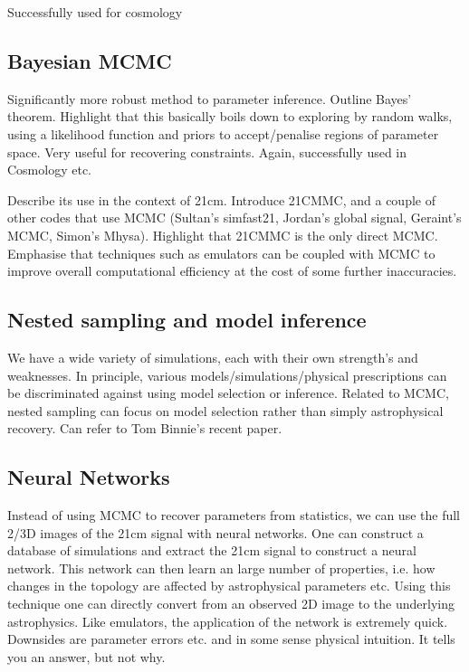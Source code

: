 Successfully used for cosmology

\subsection{Bayesian MCMC}

Significantly more robust method to parameter inference. Outline Bayes' theorem. Highlight that this basically boils down to exploring by random walks, using a likelihood function and priors to accept/penalise regions of parameter space. Very useful for recovering constraints. Again, successfully used in Cosmology etc.

Describe its use in the context of 21cm. Introduce 21CMMC, and a couple of other codes that use MCMC (Sultan's simfast21, Jordan's global signal, Geraint's MCMC, Simon's Mhysa). Highlight that 21CMMC is the only direct MCMC. Emphasise that techniques such as emulators can be coupled with MCMC to improve overall computational efficiency at the cost of some further inaccuracies.

\subsection{Nested sampling and model inference}

We have a wide variety of simulations, each with their own strength's and weaknesses. In principle, various models/simulations/physical prescriptions can be discriminated against using model selection or inference. Related to MCMC, nested sampling can focus on model selection rather than simply astrophysical recovery. Can refer to Tom Binnie's recent paper.

\subsection{Neural Networks}

Instead of using MCMC to recover parameters from statistics, we can use the full 2/3D images of the 21cm signal with neural networks. One can construct a database of simulations and extract the 21cm signal to construct a neural network. This network can then learn an large number of properties, i.e. how changes in the topology are affected by astrophysical parameters etc. Using this technique one can directly convert from an observed 2D image to the underlying astrophysics. Like emulators, the application of the network is extremely quick. Downsides are parameter errors etc. and in some sense physical intuition. It tells you an answer, but not why.

